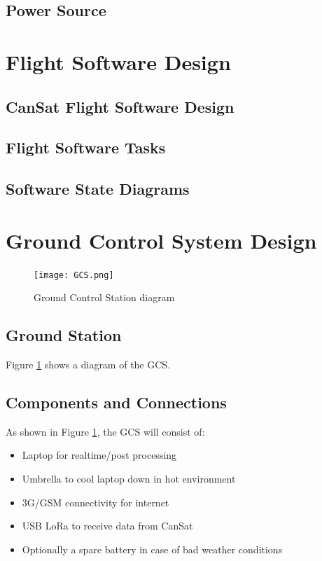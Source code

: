 \documentclass[10pt, a4paper]{article}
\begin{document}
\subsection{Power Source}

\newpage

\section{Flight Software Design}
\subsection{CanSat Flight Software Design}
\subsection{Flight Software Tasks}
\subsection{Software State Diagrams}

\newpage

\section{Ground Control System Design}

\begin{figure}
\centering
\texttt{[image: GCS.png]}
\caption{Ground Control Station diagram}
\label{fig:gcs}
\end{figure}

\subsection{Ground Station}
Figure \ref{fig:gcs} shows a diagram of the GCS.
\subsection{Components and Connections}
As shown in Figure \ref{fig:gcs}, the GCS will consist of:
\begin{itemize}
	\item Laptop for realtime/post processing
    \item Umbrella to cool laptop down in hot environment
    \item 3G/GSM connectivity for internet
    \item USB LoRa to receive data from CanSat
    \item Optionally a spare battery in case of bad weather conditions
\end{itemize}
\end{document}
